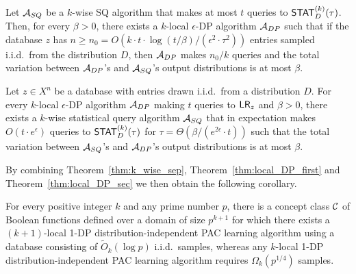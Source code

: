 \begin{theorem}\label{thm:local_DP_first}
Let $\mathcal{A}_{SQ}$ be a $k$-wise SQ algorithm that makes at most $t$ queries to $\mathsf{STAT}^{(k)}_D(\tau)$. Then, for every $\beta>0$, there exists a $k$-local $\epsilon$-DP algorithm $\mathcal{A}_{DP}$ such that if the database $z$ has $n \geq n_0=O(k \cdot t \cdot \log(t/\beta)/(\epsilon^2 \cdot \tau^2))$ entries sampled i.i.d.~from the distribution $D$, then $\mathcal{A}_{DP}$ makes $n_0/k$ queries and the total variation between $\mathcal{A}_{DP}$'s and $\mathcal{A}_{SQ}$'s output distributions is at most $\beta$.
\end{theorem}

\begin{theorem}\label{thm:local_DP_sec}
Let $z \in X^n$ be a database with entries drawn i.i.d.~from a distribution $D$. For every $k$-local  $\epsilon$-DP algorithm $\mathcal{A}_{DP}$ making $t$ queries to $\mathsf{LR}_z$ and $\beta >0$, there exists a $k$-wise statistical query algorithm $\mathcal{A}_{SQ}$ that in expectation makes $O(t \cdot e^{\epsilon})$ queries to $\mathsf{STAT}^{(k)}_D(\tau)$ for $\tau = \Theta(\beta/(e^{2\epsilon} \cdot t))$ such that the total variation between $\mathcal{A}_{SQ}$'s and $\mathcal{A}_{DP}$'s output distributions is at most $\beta$.
\end{theorem}

By combining Theorem~\ref{thm:k_wise_sep}, Theorem~\ref{thm:local_DP_first} and Theorem~\ref{thm:local_DP_sec} we then obtain the following corollary.
\begin{corollary}
\label{cor:local_DP}
For every positive integer $k$ and any prime number $p$, there is a concept class $\mathcal{C}$ of Boolean functions defined over a domain of size $p^{k+1}$ for which there exists a $(k+1)$-local 1-DP distribution-independent PAC learning algorithm using a database consisting of $\widetilde{O}_k(\log{p})$ i.i.d.~samples, whereas any $k$-local 1-DP distribution-independent PAC learning algorithm requires $\Omega_k(p^{1/4})$ samples.
\end{corollary}

